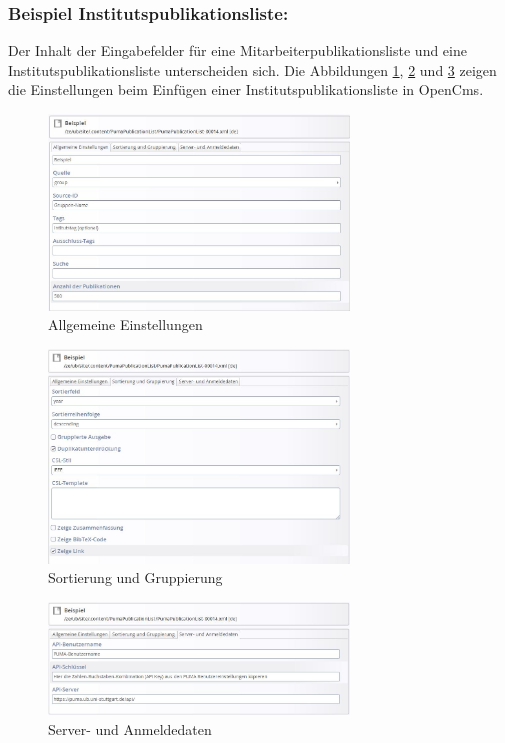 \subsubsection*{Beispiel Institutspublikationsliste:}\label{sss:ipl}
Der Inhalt der Eingabefelder für eine Mitarbeiterpublikationsliste und eine Institutspublikationsliste unterscheiden sich. Die Abbildungen \ref{fig:iplAllgemeineEinstellungen}, \ref{fig:iplSortierungGruppierung} und \ref{fig:iplServerAnmeldedaten} zeigen die Einstellungen beim Einfügen einer Institutspublikationsliste in OpenCms.
\begin{figure}[h!]
 \centering
 \includegraphics[width=8cm]{Bilder/Kapitel9/Institutsliste1.JPG}
 \caption{Allgemeine Einstellungen}
 \label{fig:iplAllgemeineEinstellungen}
\end{figure}\begin{figure}[h!]
 \centering
 \includegraphics[width=8cm]{Bilder/Kapitel9/Institutsliste2.jpeg}
 \caption{Sortierung und Gruppierung}
 \label{fig:iplSortierungGruppierung}
\end{figure}\begin{figure}[h!]
 \centering
 \includegraphics[width=8cm]{Bilder/Kapitel9/Institutsliste3.jpeg}
 \caption{Server- und Anmeldedaten}
 \label{fig:iplServerAnmeldedaten}
\end{figure}
